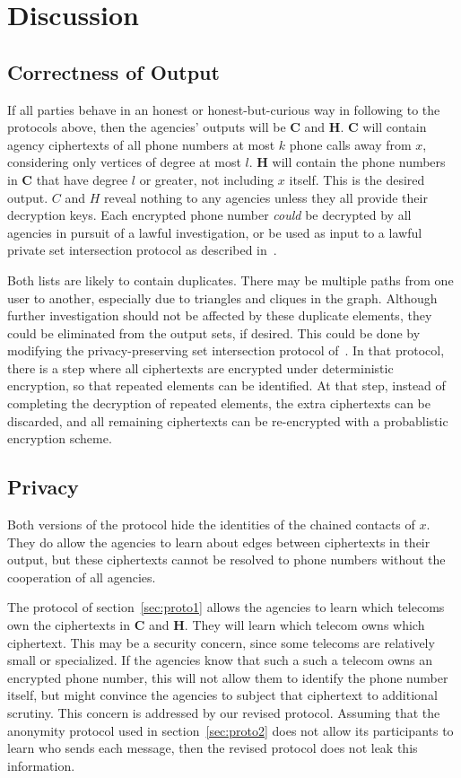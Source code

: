 \section{Discussion}

\subsection{Correctness of Output}

If all parties behave in an honest or honest-but-curious way in following to the protocols above, then the agencies' outputs will be $\mathbf{C}$ and $\mathbf{H}$. $\mathbf{C}$ will contain agency ciphertexts of all phone numbers at most $k$ phone calls away from $x$, considering only vertices of degree at most $l$. $\mathbf{H}$ will contain the phone numbers in $\mathbf{C}$ that have degree $l$ or greater, not including $x$ itself. This is the desired output. $C$ and $H$ reveal nothing to any agencies unless they all provide their decryption keys. Each encrypted phone number \emph{could} be decrypted by all agencies in pursuit of a lawful investigation, or be used as input to a lawful private set intersection protocol as described in~\cite{bandits}.

Both lists are likely to contain duplicates. There may be multiple paths from one user to another, especially due to triangles and cliques in the graph. Although further investigation should not be affected by these duplicate elements, they could be eliminated from the output sets, if desired. This could be done by modifying the privacy-preserving set intersection protocol of~\cite{bandits}. In that protocol, there is a step where all ciphertexts are encrypted under deterministic encryption, so that repeated elements can be identified. At that step, instead of completing the decryption of repeated elements, the extra ciphertexts can be discarded, and all remaining ciphertexts can be re-encrypted with a probablistic encryption scheme.

\subsection{Privacy}

Both versions of the protocol hide the identities of the chained contacts of $x$. They do allow the agencies to learn about edges between ciphertexts in their output, but these ciphertexts cannot be resolved to phone numbers without the cooperation of all agencies.

The protocol of section~\ref{sec:proto1} allows the agencies to learn which telecoms own the ciphertexts in $\mathbf{C}$ and $\mathbf{H}$. They will learn which telecom owns which ciphertext. This may be a security concern, since some telecoms are relatively small or specialized. If the agencies know that such a such a telecom owns an encrypted phone number, this will not allow them to identify the phone number itself, but might convince the agencies to subject that ciphertext to additional scrutiny. This concern is addressed by our revised protocol. Assuming that the anonymity protocol used in section~\ref{sec:proto2} does not allow its participants to learn who sends each message, then the revised protocol does not leak this information.

